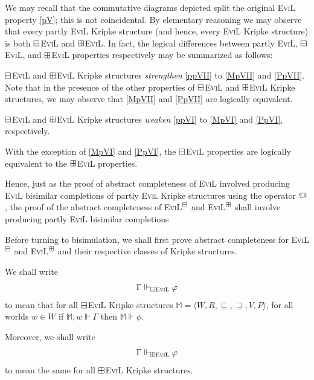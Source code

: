 We may recall that the commutative diagrams depicted split
the original \textsc{EviL} property \ref{pV};  this is not coincidental.
By elementary reasoning we may observe that every 
partly \textsc{EviL} Kripke structure 
(and hence, every \textsc{EviL} Kripke structure) is  
both $\boxminus$\textsc{EviL} and $\boxplus$\textsc{EviL}.  In fact, the logical differences between partly
\textsc{EviL}, $\boxminus$\textsc{EviL}, and $\boxplus$\textsc{EviL} properties respectively may be summarized as follows:
\begin{bul}
\item $\boxminus$\textsc{EviL} and $\boxplus$\textsc{EviL} Kripke structures \emph{strengthen} \ref{ppVII} to
\ref{MpVII} and \ref{PpVII}.  Note that in the presence of the other properties
of $\boxminus$\textsc{EviL} and $\boxplus$\textsc{EviL} Kripke structures,
we may observe that \ref{MpVII} and \ref{PpVII} are logically equivalent.
\item $\boxminus$\textsc{EviL} and $\boxplus$\textsc{EviL} Kripke structures \emph{weaken} \ref{ppVI} to
\ref{MpVI} and \ref{PpVI}, respectively.
\item With the exception of \ref{MpVI} and
\ref{PpVI}, the $\boxminus$\textsc{EviL} properties are logically
equivalent to the $\boxplus$\textsc{EviL} properties.
\end{bul}

Hence, just as the proof of abstract completeness of \textsc{EviL}
involved producing \textsc{EviL} bisimilar completions of partly
\textsc{Evil} 
Kripke structures using the operator $\invis$, 
the proof of the abstract completeness of
\textsc{EviL}$^\boxminus$ and \textsc{EviL}$^\boxplus$ shall involve producing
partly \textsc{EviL} bisimilar completions

Before turning to bisimulation, we shall first prove abstract
completeness for \textsc{EviL}$^\boxminus$ and \textsc{EviL}$^\boxplus$ and their
respective classes of Kripke structures.

\begin{definition}\label{pEviL-Vdash}
We shall write
\[ \Gamma \Vdash_{\boxminus\textup{\textsc{EviL}}} \varphi \]
to mean that for all $\boxminus$\textsc{EviL}  Kripke structures
$\mathbb{M} = \langle W, R, \sqsubseteq, \sqsupseteq, V, P \rangle$,
for all worlds $w \in W$ if $\mathbb{M},w \Vdash \Gamma$ then
$\mathbb{M} \Vdash \phi$.

Moreover, we shall write
\[ \Gamma \Vdash_{\boxplus\textup{\textsc{EviL}}} \varphi \]
to mean the same for all $\boxplus$\textsc{EviL}  Kripke structures.
\end{definition}

